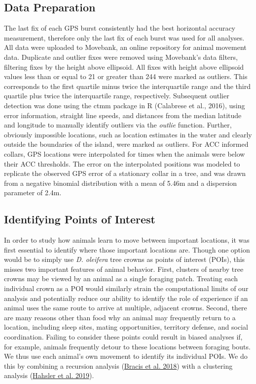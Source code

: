 \documentclass[twoside,12pt,final]{ucthesis-CA2012}
\begin{document}
\begin{ucmainmatter}
\hypertarget{data-preparation}{%
\subsection{Data Preparation}\label{data-preparation}}

The last fix of each GPS burst consistently had the best horizontal accuracy measurement, therefore only the last fix of each burst was used for all analyses. All data were uploaded to Movebank, an online repository for animal movement data. Duplicate and outlier fixes were removed using Movebank's data filters, filtering fixes by the height above ellipsoid. All fixes with height above ellipsoid values less than or equal to 21 or greater than 244 were marked as outliers. This corresponds to the first quartile minus twice the interquartile range and the third quartile plus twice the interquartile range, respectively. Subsequent outlier detection was done using the ctmm package in R (Calabrese et al., 2016), using error information, straight line speeds, and distances from the median latitude and longitude to manually identify outliers via the \emph{outlie} function. Further, obviously impossible locations, such as location estimates in the water and clearly outside the boundaries of the island, were marked as outliers. For ACC informed collars, GPS locations were interpolated for times when the animals were below their ACC thresholds. The error on the interpolated positions was modeled to replicate the observed GPS error of a stationary collar in a tree, and was drawn from a negative binomial distribution with a mean of 5.46m and a dispersion parameter of 2.4m.

\hypertarget{identifying-points-of-interest}{%
\subsection{Identifying Points of Interest}\label{identifying-points-of-interest}}

In order to study how animals learn to move between important locations, it was first essential to identify where those important locations are. Though one option would be to simply use \emph{D. oleifera} tree crowns as points of interest (POIs), this misses two important features of animal behavior. First, clusters of nearby tree crowns may be viewed by an animal as a single foraging patch. Treating each individual crown as a POI would similarly strain the computational limits of our analysis and potentially reduce our ability to identify the role of experience if an animal uses the same route to arrive at multiple, adjacent crowns. Second, there are many reasons other than food why an animal may frequently return to a location, including sleep sites, mating opportunities, territory defense, and social coordination. Failing to consider these points could result in biased analyses if, for example, animals frequently detour to these locations between foraging bouts. We thus use each animal's own movement to identify its individual POIs. We do this by combining a recursion analysis (\protect\hyperlink{ref-bracis2018}{Bracis et al. 2018}) with a clustering analysis (\protect\hyperlink{ref-hahsler2019}{Hahsler et al. 2019}).


\end{ucmainmatter}
\end{document}
